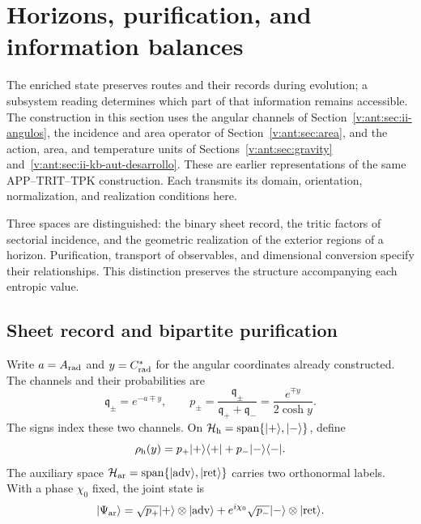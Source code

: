 
\section{Horizons, purification, and information balances}
\label{vii:sec:horizontes-informacion}

The enriched state preserves routes and their records during
evolution; a subsystem reading determines which part of that information
remains accessible. The construction in this section uses the angular
channels of Section~\ref{v:ant:sec:ii-angulos}, the incidence and
area operator of Section~\ref{v:ant:sec:area}, and the action,
area, and temperature units of
Sections~\ref{v:ant:sec:gravity}
and~\ref{v:ant:sec:ii-kb-aut-desarrollo}. These are earlier representations of the
same APP--TRIT--TPK construction. Each transmits its domain,
orientation, normalization, and realization conditions here.

Three spaces are distinguished: the binary sheet record, the tritic
factors of sectorial incidence, and the geometric realization of the
exterior regions of a horizon. Purification, transport of observables,
and dimensional conversion specify their relationships. This
distinction preserves the structure accompanying each entropic value.

\subsection{Sheet record and bipartite purification}
\label{vii:subsec:hojas-purificacion}

Write \(a=A_{\rm rad}\) and \(y=C^*_{\rm rad}\) for the
angular coordinates already constructed. The channels and their probabilities are
\begin{equation}
 \mathfrak q_\pm=e^{-a\mp y},\qquad
 p_\pm=\frac{\mathfrak q_\pm}{\mathfrak q_++\mathfrak q_-}
       =\frac{e^{\mp y}}{2\cosh y}.
 \label{vii:eq:probabilidades-hoja}
\end{equation}
The signs index these two channels. On
\(\mathcal H_{\rm h}=\operatorname{span}\{|+\rangle,|-\rangle\}\),
define
\[
 \rho_{\rm h}(y)=p_+|+\rangle\langle+|+p_-|-\rangle\langle-|.
\]
The auxiliary space
\(\mathcal H_{\rm ar}=\operatorname{span}
\{|\mathrm{adv}\rangle,|\mathrm{ret}\rangle\}\)
carries two orthonormal labels. With a phase \(\chi_0\) fixed, the joint
state is
\begin{equation}
 |\Psi_{\rm ar}\rangle
 =\sqrt{p_+}|+\rangle\otimes|\mathrm{adv}\rangle
  +e^{i\chi_0}\sqrt{p_-}|-\rangle\otimes|\mathrm{ret}\rangle.
 \label{vii:eq:purificacion-hoja}
\end{equation}

